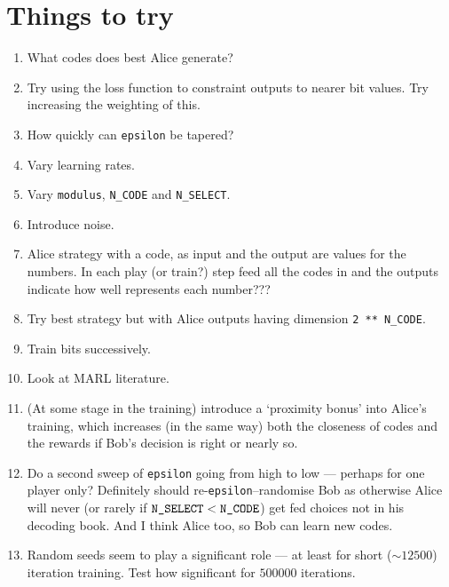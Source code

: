 \documentclass[12pt]{article}
\begin{document}
\section{Things to try}

\begin{enumerate}
	\item What codes does best Alice generate?
	
	\item Try using the loss function to constraint outputs to nearer bit values.  Try increasing the weighting of this.
	
	\item How quickly can \verb|epsilon| be tapered? 
	
	\item Vary learning rates.
	
	\item Vary \verb|modulus|, \verb|N_CODE| and \verb|N_SELECT|.
	
	\item Introduce noise.
	
	\item Alice strategy with a code, as input and the output are values for the numbers.  In each play (or train?) step feed all the codes in and the outputs indicate how well represents each number???
	
	\item Try best strategy but with Alice outputs having dimension \verb|2 ** N_CODE|.
	
	\item Train bits successively. 
	
	\item Look at MARL literature.
	
	\item (At some stage in the training) introduce a `proximity bonus' into Alice's training, which increases (in the same way) both the closeness of codes and the rewards if Bob's decision is right or nearly so.
	
	\item Do a second sweep of \verb|epsilon| going from high to low --- perhaps for one player only?  Definitely should re-\verb|epsilon|--randomise Bob as otherwise Alice will never (or rarely if $\verb|N_SELECT| < \verb|N_CODE|$) get fed choices not in his decoding book.  And I think Alice too, so Bob can learn new codes.
	
	\item Random seeds seem to play a significant role --- at least for short ($\sim \num{12500}$) iteration training.  Test how significant for $\num{500000}$ iterations.
	
\end{enumerate}







\end{document}
